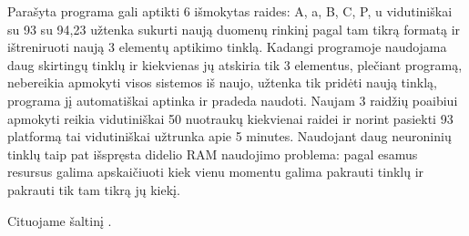 \documentclass[conference]{IEEEtran}
\begin{document}
Parašyta programa gali aptikti 6 išmokytas raides: A, a, B, C, P, u vidutiniškai su
93%
su 94,23%
užtenka sukurti naują duomenų rinkinį pagal tam tikrą formatą ir ištreniruoti naują
3 elementų aptikimo tinklą. Kadangi programoje naudojama daug skirtingų tinklų ir kiekvienas
jų atskiria tik 3 elementus, plečiant programą, nebereikia apmokyti visos sistemos iš naujo,
užtenka tik pridėti naują tinklą, programa jį automatiškai aptinka ir pradeda naudoti.
Naujam 3 raidžių poaibiui apmokyti reikia vidutiniškai 50 nuotraukų kiekvienai raidei ir
norint pasiekti 93%
platformą tai vidutiniškai užtrunka apie 5 minutes. Naudojant daug neuroninių tinklų
taip pat išspręsta didelio RAM naudojimo problema: pagal esamus resursus galima
apskaičiuoti kiek vienu momentu galima pakrauti tinklų ir pakrauti tik tam tikrą jų
kiekį.

Cituojame šaltinį \cite{lecun2015deep}.



\end{document}
